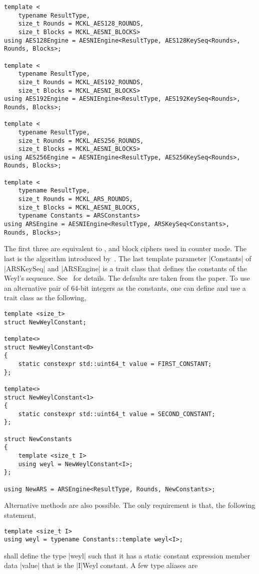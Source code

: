 \begin{Verbatim}
template <
    typename ResultType,
    size_t Rounds = MCKL_AES128_ROUNDS,
    size_t Blocks = MCKL_AESNI_BLOCKS>
using AES128Engine = AESNIEngine<ResultType, AES128KeySeq<Rounds>, Rounds, Blocks>;

template <
    typename ResultType,
    size_t Rounds = MCKL_AES192_ROUNDS,
    size_t Blocks = MCKL_AESNI_BLOCKS>
using AES192Engine = AESNIEngine<ResultType, AES192KeySeq<Rounds>, Rounds, Blocks>;

template <
    typename ResultType,
    size_t Rounds = MCKL_AES256_ROUNDS,
    size_t Blocks = MCKL_AESNI_BLOCKS>
using AES256Engine = AESNIEngine<ResultType, AES256KeySeq<Rounds>, Rounds, Blocks>;

template <
    typename ResultType,
    size_t Rounds = MCKL_ARS_ROUNDS,
    size_t Blocks = MCKL_AESNI_BLOCKS,
    typename Constants = ARSConstants>
using ARSEngine = AESNIEngine<ResultType, ARSKeySeq<Constants>, Rounds, Blocks>;
\end{Verbatim}
The first three are equivalent to ,  and  block ciphers
used in counter mode. The last is the \ars algorithm introduced
by~\cite{Salmon:2011um}. The last template parameter |Constants| of |ARSKeySeq|
and |ARSEngine| is a trait class that defines the constants of the Weyl's
sequence. See~\cite{Salmon:2011um} for details. The defaults are taken from the
paper. To use an alternative pair of 64-bit integers as the constants, one can
define and use a trait class as the following,
\begin{Verbatim}
template <size_t>
struct NewWeylConstant;

template<>
struct NewWeylConstant<0>
{
    static constexpr std::uint64_t value = FIRST_CONSTANT;
};

template<>
struct NewWeylConstant<1>
{
    static constexpr std::uint64_t value = SECOND_CONSTANT;
};

struct NewConstants
{
    template <size_t I>
    using weyl = NewWeylConstant<I>;
};

using NewARS = ARSEngine<ResultType, Rounds, NewConstants>;
\end{Verbatim}
Alternative methods are also possible. The only requirement is that, the
following statement,
\begin{Verbatim}
template <size_t I>
using weyl = typename Constants::template weyl<I>;
\end{Verbatim}
shall define the type |weyl| such that it has a static constant expression
member data |value| that is the |I|\ith Weyl constant. A few type aliases are
